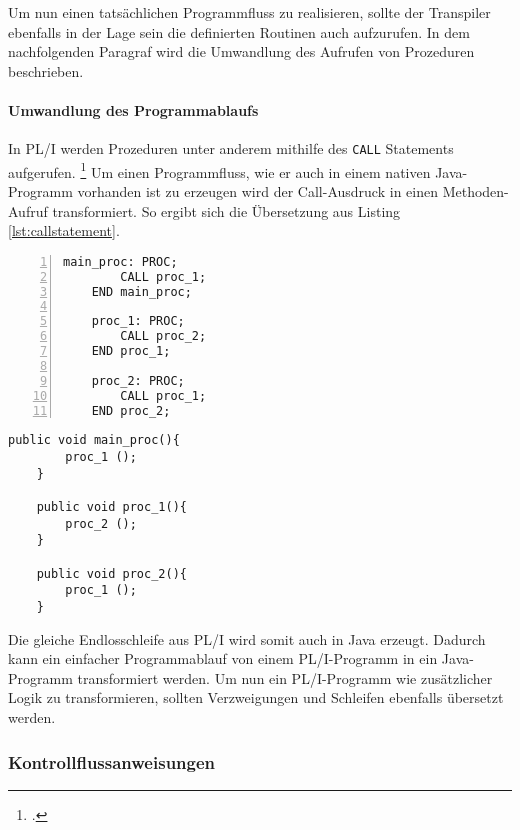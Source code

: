 Um nun einen tatsächlichen Programmfluss zu realisieren, sollte der Transpiler ebenfalls in der Lage sein die definierten Routinen auch aufzurufen.
In dem nachfolgenden Paragraf wird die Umwandlung des Aufrufen von Prozeduren beschrieben.
\pagebreak
\paragraph{Umwandlung des Programmablaufs}

In PL/I werden Prozeduren unter anderem mithilfe des \verb+CALL+ Statements aufgerufen. \footcite[Vgl. ][S.133ff. ]{pliref} Um einen Programmfluss, wie er auch in einem nativen Java-Programm vorhanden ist zu erzeugen wird der Call-Ausdruck in einen Methoden-Aufruf transformiert. 
So ergibt sich die Übersetzung aus Listing \ref{lst:callstatement}.

\begin{minipage}[b]{0.48\linewidth}
	\centering
	\lstset{language=PL/I,label=SliceExaple}
	\begin{lstlisting}[frame=single, numbers=left, mathescape,%
		caption={Prozeduraufruf}, label={lst:callstatement}]
	main_proc: PROC;
		CALL proc_1;
	END main_proc;
		
	proc_1: PROC;
		CALL proc_2;
	END proc_1;
		
	proc_2: PROC;
		CALL proc_1;
	END proc_2;
	\end{lstlisting}
\end{minipage}
\hspace{0.5cm}
\begin{minipage}[b]{0.48\linewidth}
	\centering
	\lstset{language=Java,label=SliceExaple}
	\begin{lstlisting}[frame=single, mathescape,%
		title={" "}]
	public void main_proc(){
		proc_1 ();
	}
		
	public void proc_1(){
		proc_2 ();
	}
		
	public void proc_2(){
		proc_1 ();
	}
	\end{lstlisting}
\end{minipage}


Die gleiche Endlosschleife aus PL/I wird somit auch in Java erzeugt.
Dadurch kann ein einfacher Programmablauf von einem PL/I-Programm in ein Java-Programm transformiert werden.
Um nun ein PL/I-Programm wie zusätzlicher Logik zu transformieren, sollten Verzweigungen und Schleifen ebenfalls übersetzt werden.

\pagebreak
\subsubsection{Kontrollflussanweisungen}
